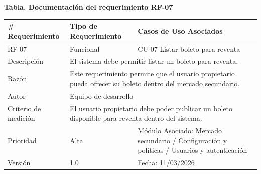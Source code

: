 \documentclass[12pt,letterpaper]{article}
\begin{document}
\noindent
\begin{minipage}{\textwidth}
\centering
\scriptsize
\renewcommand{\arraystretch}{0.9}
\setlength{\tabcolsep}{3pt}
\setlength{\arrayrulewidth}{0.5pt}

\textbf{Tabla. Documentación del requerimiento RF-07}

\vspace{2pt}

\begin{tabularx}{\textwidth}{|p{2.6cm}|X|p{3.4cm}|}
\hline
\# Requerimiento & Tipo de Requerimiento & Casos de Uso Asociados \\ \hline
RF-07 & Funcional & CU-07 Listar boleto para reventa \\ \hline
Descripción & \multicolumn{2}{X|}{El sistema debe permitir listar un boleto para reventa.} \\ \hline
Razón & \multicolumn{2}{X|}{Este requerimiento permite que el usuario propietario pueda ofrecer su boleto dentro del mercado secundario.} \\ \hline
Autor & \multicolumn{2}{X|}{Equipo de desarrollo} \\ \hline
Criterio de medición & \multicolumn{2}{X|}{El usuario propietario debe poder publicar un boleto disponible para reventa dentro del sistema.} \\ \hline
Prioridad & Alta & Módulo Asociado: Mercado secundario / Configuración y políticas / Usuarios y autenticación \\ \hline
Versión & 1.0 & Fecha: 11/03/2026 \\ \hline
\end{tabularx}
\end{minipage}

\vspace{0.2cm}
\end{document}
